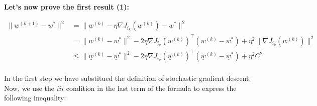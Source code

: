 \textbf{Let's now prove the first result (1):}

\begin{minipage}[c]{0.7\linewidth}
    \[
        \begin{split}
            \| \underline{w}^{(k+1)} - \underline{w}^*\|^2 &= \| \underline{w}^{(k)} -  \eta \nabla J_{i_k}(\underline{w}^{(k)}) - \underline{w}^*\|^2\\
            &= \| \underline{w}^{(k)} - \underline{w}^*\|^2 - 2\eta \nabla J_{i_k}(\underline{w}^{(k)})^\intercal (\underline{w}^{(k)} - \underline{w}^*) + \eta^2 \|\nabla J_{i_k}(\underline{w}^{(k)})\|^2\\    
            &\leq \| \underline{w}^{(k)} - \underline{w}^*\|^2 - 2\eta \nabla J_{i_k}(\underline{w}^{(k)})^\intercal (\underline{w}^{(k)} - \underline{w}^*) + \eta^2 C^2\\
        \end{split}
    \]
    \end{minipage} %
    \begin{minipage}[c]{0.25\linewidth}
        In the first step we have substitued the definition of stochastic gradient descent. Now, we use the $iii$ condition in the last term of the formula to express the following inequality:
    \end{minipage}


